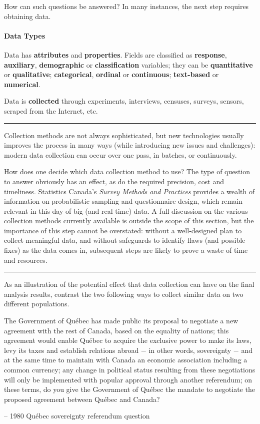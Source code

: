 \noindent How can such questions be answered? In many instances, the next step requires obtaining data.   
\newpage\noindent 
\paragraph{Data Types} 
Data has \textbf{attributes} and \textbf{properties}. Fields are classified as \textbf{response}, \textbf{auxiliary}, \textbf{demographic} or \textbf{classification} variables; they can be \textbf{quantitative} or \textbf{qualitative}; \textbf{categorical}, \textbf{ordinal} or \textbf{continuous}; \textbf{text-based} or \textbf{numerical}. \par Data is \textbf{collected} through experiments, interviews, censuses, surveys, sensors, scraped from the Internet, etc. 
\begin{center}
    \rule{0.5\textwidth}{.4pt}
\end{center} Collection methods are not always sophisticated, but new technologies usually improves the process in many ways (while introducing new issues and challenges): modern data collection can occur over one pass, in batches, or continuously.
\par How does one decide which data collection method to use? The type of question to answer obviously has an effect, as do the required precision, cost and timeliness. Statistics Canada's \textit{Survey Methods and Practices} provides a wealth of information on probabilistic sampling and questionnaire design, which remain relevant in this day of big (and real-time) data. \newl A full discussion on the various collection methods currently available is outside the scope of this section, but the importance of this step cannot be overstated: without a well-designed plan to collect meaningful data, and without safeguards to identify flaws (and possible fixes) as the data comes in, subsequent steps are likely to prove a waste of time and resources. \begin{center}
    \rule{0.5\textwidth}{.4pt}
\end{center}
As an illustration of the potential effect that data collection can have on the final analysis results, contrast the two following ways to collect similar data on two different populations.
\begin{tcolorbox}[title=Yes. I Mean No. ... I Think.]
The Government of Qu\'ebec has made public its proposal to negotiate a new agreement with the rest of Canada, based on the equality of nations; this agreement would enable Qu\'ebec to acquire the exclusive power to make its laws, levy its taxes and establish relations abroad $-$ in other words, sovereignty $-$ and at the same time to maintain with Canada an economic association including a common currency; any change in political status resulting from these negotiations will only be implemented with popular approval through another referendum; on these terms, do you give the Government of Qu\'ebec the mandate to negotiate the proposed agreement between Qu\'ebec and Canada? \\[-0.6cm]
\begin{flushright}
-- 1980 Qu\'ebec sovereignty referendum question
\end{flushright}
\end{tcolorbox}
